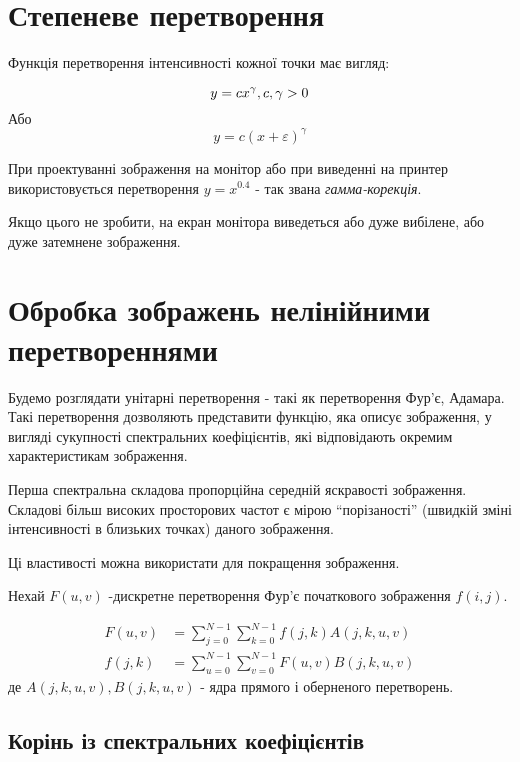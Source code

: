 \section{Степеневе перетворення}
Функція перетворення інтенсивності кожної точки має вигляд:

\[
y = cx^{\gamma}, \\ c, \gamma > 0    
\]
Або 
\[
y = c(x + \varepsilon)^{\gamma}  
\]

\begin{example}
   При проектуванні зображення на монітор або при виведенні на принтер використовується
   перетворення $y = x^{0.4}$ - так звана {\itshape гамма-корекція}.

   Якщо цього не зробити, на екран монітора виведеться або дуже вибілене, або дуже затемнене зображення.
\end{example}

\section{Обробка зображень нелінійними перетвореннями}
Будемо розглядати унітарні перетворення - такі як перетворення Фур'є, Адамара.
Такі перетворення дозволяють представити функцію, яка описує зображення,
у вигляді сукупності спектральних коефіцієнтів, які відповідають окремим характеристикам зображення.

\begin{proposition}
   Перша спектральна складова пропорційна середній яскравості зображення.
   Складові більш високих просторових частот є мірою ``порізаності'' (швидкій зміні інтенсивності в близьких точках) даного зображення.

\end{proposition}
Ці властивості можна використати для покращення зображення.

Нехай $F(u, v)$ -дискретне перетворення Фур'є початкового зображення $f(i, j)$.

\begin{align}
    F(u, v) &= \sum_{j=0}^{N-1} \sum_{k=0}^{N-1} f(j, k) A(j, k, u, v) \\
    f(j, k) &= \sum_{u=0}^{N-1} \sum_{v=0}^{N-1} F(u, v) B(j, k, u, v)
\end{align}
де $A(j, k, u, v), B(j, k, u, v)$ - ядра прямого і оберненого перетворень.

\subsection{Корінь із спектральних коефіцієнтів}

